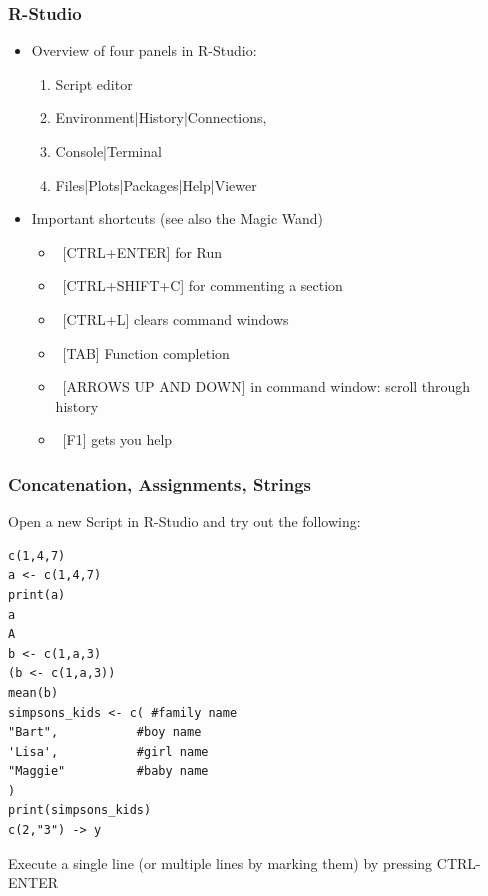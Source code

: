 \documentclass[xcolor={svgnames},10pt,
handout
]{beamer}
\begin{document}
\begin{frame}
\frametitle{R-Studio}
\begin{itemize}
	\item Overview of four panels in R-Studio:
	\begin{enumerate}
		\item Script editor
		\item Environment|History|Connections,
		\item Console|Terminal
		\item Files|Plots|Packages|Help|Viewer
	\end{enumerate} 
	\item Important shortcuts (see also the Magic Wand)
	\begin{itemize}
		\item ~[CTRL+ENTER] for Run
		\item ~[CTRL+SHIFT+C] for commenting a section
		\item ~[CTRL+L] clears command windows
		\item ~[TAB] Function completion
		\item ~[ARROWS UP AND DOWN] in command window: scroll through history
		\item ~[F1] gets you help
	\end{itemize}
\end{itemize}
\end{frame}


\begin{frame}[fragile]
\frametitle{Concatenation, Assignments, Strings}\footnotesize
Open a new Script in R-Studio and try out the following:
\begin{lstlisting}
c(1,4,7)
a <- c(1,4,7)
print(a)
a
A
b <- c(1,a,3)
(b <- c(1,a,3))
mean(b)
simpsons_kids <- c( #family name
"Bart",           #boy name
'Lisa',           #girl name
"Maggie"          #baby name
)
print(simpsons_kids)
c(2,"3") -> y
\end{lstlisting}
Execute a single line (or multiple lines by marking them) by pressing \textsc{CTRL-ENTER}\\
\end{frame}
\end{document}
